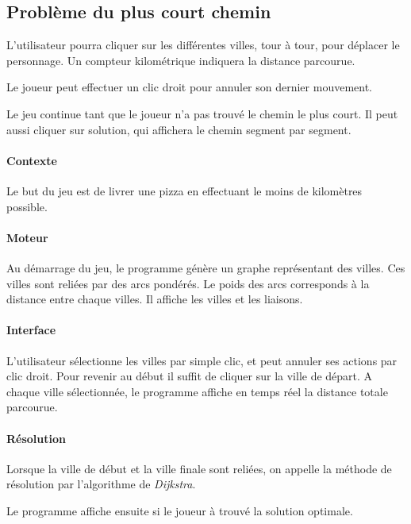 \subsection{Problème du plus court chemin}
        L'utilisateur pourra cliquer sur les différentes villes, tour à tour,
        pour déplacer le personnage. Un compteur kilométrique indiquera la
        distance parcourue.

        Le joueur peut effectuer un clic droit pour annuler son dernier
        mouvement.

        Le jeu continue tant que le joueur n'a pas trouvé le chemin
        le plus court. Il peut aussi cliquer sur \og solution\fg, qui
        affichera le chemin segment par segment.

        \paragraph{Contexte}
            Le but du jeu est de livrer une pizza en effectuant le moins de kilomètres possible.
        \paragraph{Moteur}
            Au démarrage du jeu, le programme génère un graphe
            représentant des villes. Ces villes sont reliées par des arcs pondérés.
            Le poids des arcs corresponds à la distance entre chaque villes.
            Il affiche les villes et les liaisons.

        \paragraph{Interface}
            L'utilisateur sélectionne les villes par simple clic,
            et peut annuler ses actions par clic droit.
            Pour revenir au début il suffit de cliquer sur la ville de départ.
            A chaque ville sélectionnée, le programme
            affiche en temps réel la distance totale parcourue.

        \paragraph{Résolution}
            Lorsque la ville de début et la ville finale sont reliées,
            on appelle la méthode de résolution par l'algorithme de \emph{Dijkstra}.

            Le programme affiche ensuite si le joueur à trouvé la solution optimale.

